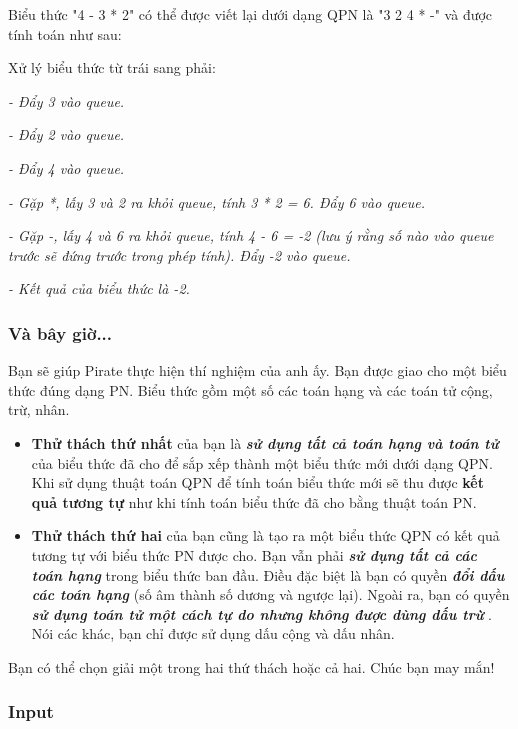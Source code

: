    Biểu thức "4 - 3 * 2" có thể được viết lại dưới dạng QPN là "3 2 4 * -" và được tính toán như sau:  

    Xử lý biểu thức từ trái sang phải:   

\emph{    - Đẩy 3 vào queue.   }

\emph{    - Đẩy 2 vào queue.   }

\emph{    - Đẩy 4 vào queue.   }

\emph{    - Gặp *, lấy 3 và 2 ra khỏi queue, tính 3 * 2 = 6. Đẩy 6 vào queue.   }

\emph{    - Gặp -, lấy 4 và 6 ra khỏi queue, tính 4 - 6 = -2 (lưu ý rằng số nào vào queue trước sẽ đứng trước trong phép tính). Đẩy -2 vào queue.    
\\}

\emph{    - Kết quả của biểu thức là -2.   }

\subsubsection{   Và bây giờ...  }

   Bạn sẽ giúp Pirate thực hiện thí nghiệm của anh ấy. Bạn được giao cho một biểu thức đúng dạng PN. Biểu thức gồm một số các toán hạng và các toán tử cộng, trừ, nhân.  
\begin{itemize}
	\item \textbf{      Thử thách thứ nhất     }    của bạn là    \emph{\textbf{      sử dụng tất cả toán hạng và toán tử     }}    của biểu thức đã cho để sắp xếp thành một biểu thức mới dưới dạng QPN. Khi sử dụng thuật toán QPN để tính toán biểu thức mới sẽ thu được    \textbf{     kết quả tương tự    }    như khi tính toán biểu thức đã cho bằng thuật toán PN.   
	\item \textbf{      Thử thách thứ hai     }    của bạn cũng là tạo ra một biểu thức QPN có kết quả tương tự với biểu thức PN được cho. Bạn vẫn phải    \textbf{\emph{      sử dụng tất cả các toán hạng     }}    trong biểu thức ban đầu. Điều đặc biệt là bạn có quyền    \textbf{\emph{      đổi dấu các toán hạng     }}    (số âm thành số dương và ngược lại). Ngoài ra, bạn có quyền    \textbf{\emph{      sử dụng toán tử một cách tự do nhưng không được dùng dấu trừ     }}    . Nói các khác, bạn chỉ được sử dụng dấu cộng và dấu nhân.   
\end{itemize}

   Bạn có thể chọn giải một trong hai thứ thách hoặc cả hai. Chúc bạn may mắn!  

\subsubsection{   Input  }

